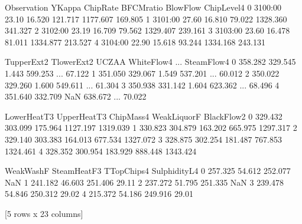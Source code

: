 \documentclass[letterpaper,10pt,english]{jupyterBook}
\begin{document}
\begin{sphinxVerbatim}[commandchars=\\\{\}]
  
\end{sphinxVerbatim}

\begin{sphinxVerbatim}[commandchars=\\\{\}]
  Observation  Y\PYGZhy{}Kappa  ChipRate  BF\PYGZhy{}CMratio  BlowFlow  ChipLevel4   \PYGZbs{}
0    31\PYGZhy{}00:00    23.10    16.520     121.717  1177.607      169.805   
1    31\PYGZhy{}01:00    27.60    16.810      79.022  1328.360      341.327   
2    31\PYGZhy{}02:00    23.19    16.709      79.562  1329.407      239.161   
3    31\PYGZhy{}03:00    23.60    16.478      81.011  1334.877      213.527   
4    31\PYGZhy{}04:00    22.90    15.618      93.244  1334.168      243.131   

   T\PYGZhy{}upperExt\PYGZhy{}2   T\PYGZhy{}lowerExt\PYGZhy{}2    UCZAA  WhiteFlow\PYGZhy{}4   ...  SteamFlow\PYGZhy{}4   \PYGZbs{}
0        358.282         329.545  1.443       599.253  ...        67.122   
1        351.050         329.067  1.549       537.201  ...        60.012   
2        350.022         329.260  1.600       549.611  ...        61.304   
3        350.938         331.142  1.604       623.362  ...        68.496   
4        351.640         332.709    NaN       638.672  ...        70.022   

   Lower\PYGZhy{}HeatT\PYGZhy{}3  Upper\PYGZhy{}HeatT\PYGZhy{}3   ChipMass\PYGZhy{}4   WeakLiquorF   BlackFlow\PYGZhy{}2   \PYGZbs{}
0        329.432         303.099      175.964      1127.197      1319.039   
1        330.823         304.879      163.202       665.975      1297.317   
2        329.140         303.383      164.013       677.534      1327.072   
3        328.875         302.254      181.487       767.853      1324.461   
4        328.352         300.954      183.929       888.448      1343.424   

   WeakWashF   SteamHeatF\PYGZhy{}3   T\PYGZhy{}Top\PYGZhy{}Chips\PYGZhy{}4   SulphidityL\PYGZhy{}4   
0     257.325         54.612         252.077             NaN  
1     241.182         46.603         251.406           29.11  
2     237.272         51.795         251.335             NaN  
3     239.478         54.846         250.312           29.02  
4     215.372         54.186         249.916           29.01  

[5 rows x 23 columns]
\end{sphinxVerbatim}
\end{document}
